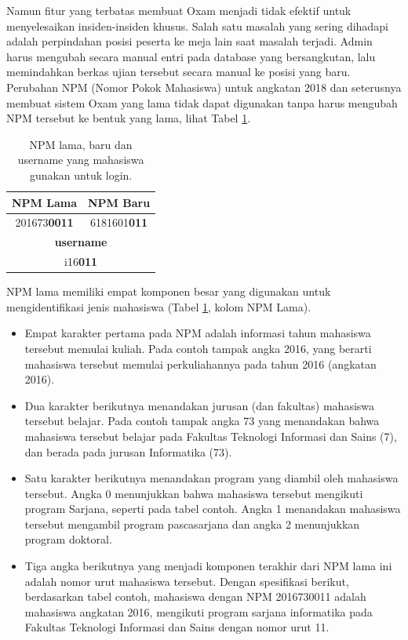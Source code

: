 Namun fitur yang terbatas membuat Oxam menjadi tidak efektif untuk menyelesaikan insiden-insiden khusus. Salah satu masalah yang sering dihadapi adalah perpindahan posisi peserta ke meja lain saat masalah terjadi. Admin harus mengubah secara manual entri pada database yang bersangkutan, lalu memindahkan berkas ujian tersebut secara manual ke posisi yang baru.
Perubahan NPM (Nomor Pokok Mahasiswa) untuk angkatan 2018 dan seterusnya membuat sistem Oxam yang lama tidak dapat digunakan tanpa harus mengubah NPM tersebut ke bentuk yang lama, lihat Tabel \ref{tab:table-npm}. 

\begin{table}[H]
    \centering
    \def\arraystretch{2}
    \begin{tabular}{|c|c|}
        \hline
        \textbf{NPM Lama} & \textbf{NPM Baru} \\
        \hline
        201673\textbf{0011} & 6181601\textbf{011} \\
        \hline
        \multicolumn{2}{|c|}{\textbf{username}} \\
        \hline
        \multicolumn{2}{|c|}{i16\textbf{011}} \\
        \hline
    \end{tabular}
    \caption{NPM lama, baru dan username yang mahasiswa gunakan untuk login.}
    \label{tab:table-npm}
\end{table}

NPM lama memiliki empat komponen besar yang digunakan untuk mengidentifikasi jenis mahasiswa (Tabel \ref{tab:table-npm}, kolom NPM Lama). 
\begin{itemize}
    \item Empat karakter pertama pada NPM adalah informasi tahun mahasiswa tersebut memulai kuliah. Pada contoh tampak angka 2016, yang berarti mahasiswa tersebut memulai perkuliahannya pada tahun 2016 (angkatan 2016). 
    
    \item Dua karakter berikutnya menandakan jurusan (dan fakultas) mahasiswa tersebut belajar. Pada contoh tampak angka 73 yang menandakan bahwa mahasiswa tersebut belajar pada Fakultas Teknologi Informasi dan Sains (7), dan berada pada jurusan Informatika (73). 
    
    \item Satu karakter berikutnya menandakan program yang diambil oleh mahasiswa tersebut. Angka 0 menunjukkan bahwa mahasiswa tersebut mengikuti program Sarjana, seperti pada tabel contoh. Angka 1 menandakan mahasiswa tersebut mengambil program pascasarjana dan angka 2 menunjukkan program doktoral. 
    
    \item Tiga angka berikutnya yang menjadi komponen terakhir dari NPM lama ini adalah nomor urut mahasiswa tersebut. Dengan spesifikasi berikut, berdasarkan tabel contoh, mahasiswa dengan NPM 2016730011 adalah mahasiswa angkatan 2016, mengikuti program sarjana informatika pada Fakultas Teknologi Informasi dan Sains dengan nomor urut 11.
\end{itemize}

